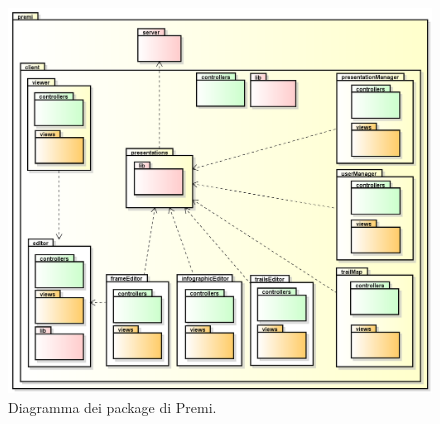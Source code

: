 \begin{figure}[H]
\begin{center}
\includegraphics[scale=0.40]{img/diapkg/package.png}
\caption{Diagramma dei package di Premi.}
\end{center}
\end{figure}

